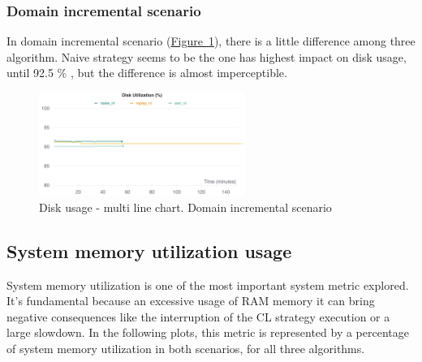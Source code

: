 \documentclass[english, LaM, oneside]{sapthesis}%
\begin{document}
\subsubsection{Domain incremental scenario}
In domain incremental scenario (\hyperref[Fig:106]{Figure~\ref*{Fig:107}}), there is a little difference among three algorithm. Naive strategy seems to be the one has highest impact on disk usage, until 92.5 \% , but the difference is almost imperceptible.
\begin{figure}[!h]
  
     \centering
     \includegraphics[width=0.60\textwidth]{overview disk utilization ni.png}
     \caption{Disk usage - multi line chart. Domain incremental scenario}\label{Fig:107}
   
   
\end{figure}




\subsection{System memory utilization usage}
System memory utilization is one of the most important system metric explored. It's fundamental because an excessive usage of RAM memory it can bring negative consequences like the interruption of the CL strategy execution or a large slowdown. In the following plots, this metric is represented by a percentage of system memory utilization in both scenarios, for all three algorithms.
\end{document}
